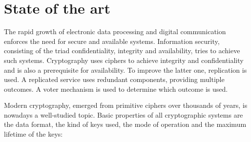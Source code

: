 \documentclass[a4paper,11pt,oneside]{memoir}
\begin{document}
%     
%   
%   
%  
% 
  
\section{State of the art}


The rapid growth of electronic data processing and digital communication enforces the need for secure and available systems.
Information security, consisting of the triad confidentiality, integrity and availability, tries to achieve such systems. 
Cryptography uses ciphers to achieve integrity and confidentiality and is also a prerequisite for availability. To improve the latter one,
replication is used. A replicated service uses redundant components, providing multiple outcomes. A voter mechanism is used to determine
which outcome is used.

Modern cryptography, emerged from primitive ciphers over thousands of years, is nowadays a well-studied topic. Basic properties of all cryptographic systems
are the data format, the kind of keys used, the mode of operation and the maximum lifetime of the keys: 
\end{document}
